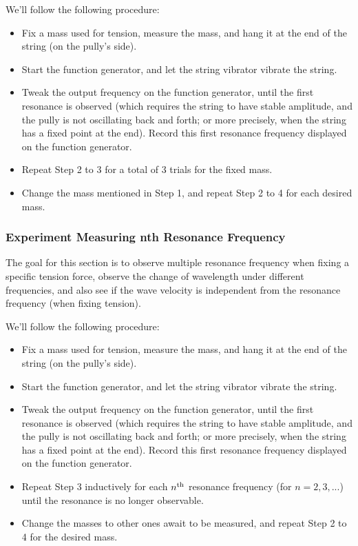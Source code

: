 \documentclass{article}
\begin{document}
We'll follow the following procedure:
\begin{itemize}
    \item[1.] Fix a mass used for tension, measure the mass, and hang it at the end of the string (on the pully's side).
    \item[2.] Start the function generator, and let the string vibrator vibrate the string.
    \item[3.] Tweak the output frequency on the function generator, until the first resonance is observed (which requires the string to have stable amplitude, and the pully is not oscillating back and forth; or more precisely, when the string has a fixed point at the end). Record this first resonance frequency displayed on the function generator.
    \item[4.] Repeat Step 2 to 3 for a total of 3 trials for the fixed mass.
    \item[5.] Change the mass mentioned in Step 1, and repeat Step 2 to 4 for each desired mass.
\end{itemize}

\subsubsection{Experiment Measuring nth Resonance Frequency}
The goal for this section is to observe multiple resonance frequency when fixing a specific tension force, observe the change of wavelength under different frequencies, and also see if the wave velocity is independent from the resonance frequency (when fixing tension).

We'll follow the following procedure:
\begin{itemize}
    \item[1.] Fix a mass used for tension, measure the mass, and hang it at the end of the string (on the pully's side).
    \item[2.] Start the function generator, and let the string vibrator vibrate the string.
    \item[3.] Tweak the output frequency on the function generator, until the first resonance is observed (which requires the string to have stable amplitude, and the pully is not oscillating back and forth; or more precisely, when the string has a fixed point at the end). Record this first resonance frequency displayed on the function generator.
    \item[4.] Repeat Step 3 inductively for each $n^\textmd{th}$ resonance frequency (for $n=2,3,...$) until the resonance is no longer observable.
    \item[5.] Change the masses to other ones await to be measured, and repeat Step 2 to 4 for the desired mass.
\end{itemize}
\end{document}
